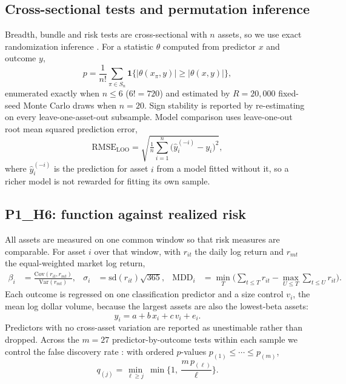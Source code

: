 \documentclass[10pt]{article}
\begin{document}
\subsection{Cross-sectional tests and permutation inference}
Breadth, bundle and risk tests are cross-sectional with $n$ assets, so we use exact randomization inference \citep{fisher1935design}. For a statistic $\theta$ computed from predictor $x$ and outcome $y$,
\begin{equation}
p = \frac{1}{n!}\sum_{\pi \in S_n}\mathbf{1}\{|\theta(x_{\pi},y)| \ge |\theta(x,y)|\},
\end{equation}
enumerated exactly when $n \le 6$ ($6! = 720$) and estimated by $R = 20{,}000$ fixed-seed Monte Carlo draws when $n = 20$. Sign stability is reported by re-estimating on every leave-one-asset-out subsample. Model comparison uses leave-one-out root mean squared prediction error,
\begin{equation}
\mathrm{RMSE}_{\mathrm{LOO}} = \sqrt{\tfrac{1}{n}\textstyle\sum_{i=1}^{n}\big(\hat{y}^{(-i)}_i - y_i\big)^2},
\end{equation}
where $\hat{y}^{(-i)}_i$ is the prediction for asset $i$ from a model fitted without it, so a richer model is not rewarded for fitting its own sample.

\subsection{P1\_H6: function against realized risk}
All assets are measured on one common window so that risk measures are comparable. For asset $i$ over that window, with $r_{it}$ the daily log return and $r_{mt}$ the equal-weighted market log return,
\begin{align}
\beta_i &= \frac{\mathrm{Cov}(r_{it},r_{mt})}{\mathrm{Var}(r_{mt})},
&\sigma_i &= \mathrm{sd}(r_{it})\sqrt{365},
&\mathrm{MDD}_i &= \min_{T}\Big(\sum_{t \le T} r_{it} - \max_{U \le T}\sum_{t \le U} r_{it}\Big).
\end{align}
Each outcome is regressed on one classification predictor and a size control $v_i$, the mean log dollar volume, because the largest assets are also the lowest-beta assets:
\begin{equation}
y_i = a + b\,x_i + c\,v_i + e_i .
\end{equation}
Predictors with no cross-asset variation are reported as unestimable rather than dropped. Across the $m = 27$ predictor-by-outcome tests within each sample we control the false discovery rate \citep{benjaminihochberg1995,harvey2016cross}: with ordered $p$-values $p_{(1)} \le \cdots \le p_{(m)}$,
\begin{equation}
q_{(j)} = \min_{\ell \ge j}\ \min\Big\{1,\ \frac{m\,p_{(\ell)}}{\ell}\Big\}.
\end{equation}
\end{document}
